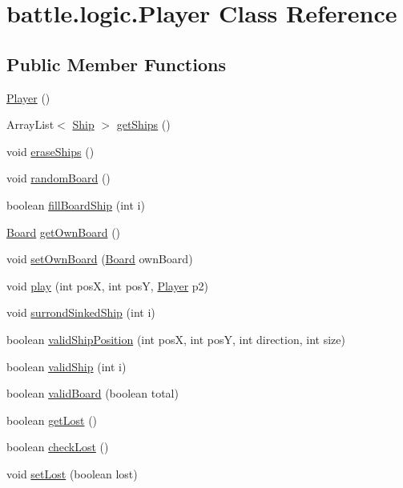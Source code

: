 \hypertarget{classbattle_1_1logic_1_1_player}{}\section{battle.\+logic.\+Player Class Reference}
\label{classbattle_1_1logic_1_1_player}
\subsection*{Public Member Functions}
\begin{DoxyCompactItemize}
\item 
\hyperlink{classbattle_1_1logic_1_1_player_aac3be0efad000e1a70ab55535e465e9c}{Player} ()
\item 
Array\+List$<$ \hyperlink{classbattle_1_1logic_1_1_ship}{Ship} $>$ \hyperlink{classbattle_1_1logic_1_1_player_aeaafff7dfe74208d3c6f34617013c945}{get\+Ships} ()
\item 
void \hyperlink{classbattle_1_1logic_1_1_player_a6babc2c9f05b556cfe00db6e49520c9e}{erase\+Ships} ()
\item 
void \hyperlink{classbattle_1_1logic_1_1_player_ad7f2dd82e160449b8c5f9c3e49dbde61}{random\+Board} ()
\item 
boolean \hyperlink{classbattle_1_1logic_1_1_player_aa09ea411ad92b0dbbbc4ce409c09eded}{fill\+Board\+Ship} (int i)
\item 
\hyperlink{classbattle_1_1logic_1_1_board}{Board} \hyperlink{classbattle_1_1logic_1_1_player_a6d4d8e662a181c00fa11aed7aa75f48d}{get\+Own\+Board} ()
\item 
void \hyperlink{classbattle_1_1logic_1_1_player_a771c6cc734c8493535a9ba09fad4a836}{set\+Own\+Board} (\hyperlink{classbattle_1_1logic_1_1_board}{Board} own\+Board)
\item 
void \hyperlink{classbattle_1_1logic_1_1_player_a4cc37bee8bc4e5574dfa9611375809b8}{play} (int pos\+X, int pos\+Y, \hyperlink{classbattle_1_1logic_1_1_player}{Player} p2)
\item 
void \hyperlink{classbattle_1_1logic_1_1_player_a33ecc3e57717496e10bae15790b24a68}{surrond\+Sinked\+Ship} (int i)
\item 
boolean \hyperlink{classbattle_1_1logic_1_1_player_a1e06122bc06936eec0c970e16fd975df}{valid\+Ship\+Position} (int pos\+X, int pos\+Y, int direction, int size)
\item 
boolean \hyperlink{classbattle_1_1logic_1_1_player_a79fbbe800a71c9c36dc6e919eecd816d}{valid\+Ship} (int i)
\item 
boolean \hyperlink{classbattle_1_1logic_1_1_player_a5ee36edb16d8e2f5954c3ab3c6f8ef47}{valid\+Board} (boolean total)
\item 
boolean \hyperlink{classbattle_1_1logic_1_1_player_aa32ec6bd823dfdc127631b6319344178}{get\+Lost} ()
\item 
boolean \hyperlink{classbattle_1_1logic_1_1_player_a3a65c588fc404d1f302e06ebb3a888b6}{check\+Lost} ()
\item 
void \hyperlink{classbattle_1_1logic_1_1_player_a04b63c731f4af62c3a8502c0ac5544ea}{set\+Lost} (boolean lost)
\end{DoxyCompactItemize}


